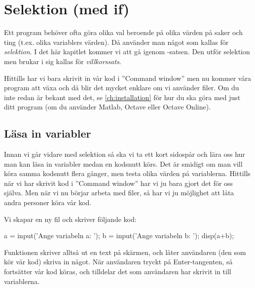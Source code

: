 %
%
\chapter{Selektion (med if)}\label{ch:selektion}
Ett program behöver ofta göra olika val beroende på olika värden på saker och ting (t.ex. olika variablers värden). Då använder man något som kallas för \emph{selektion}. I det här kapitlet kommer vi att gå igenom -satsen. Den utför selektion men brukar i sig kallas för \emph{villkorssats}.

Hittills har vi bara skrivit in vår kod i ''Command window'' men nu kommer våra program att växa och då blir det mycket enklare om vi använder filer. Om du inte redan är bekant med det, se \autoref{ch:installation} för hur du ska göra med just ditt program (om du använder Matlab, Octave eller Octave Online).

\section{Läsa in variabler}
Innan vi går vidare med selektion så ska vi ta ett kort sidospår och lära oss hur man kan läsa in variabler medan en kodsnutt körs. Det är smidigt om man vill köra samma kodsnutt flera gånger, men testa olika värden på variablerna. Hittills när vi har skrivit kod i ''Command window'' har vi ju bara gjort det för oss själva. Men när vi nu börjar arbeta med filer, så har vi ju möjlighet att låta andra personer köra vår kod.

Vi skapar en ny fil och skriver följande kod:

\begin{matlab}[caption={Läsa in variabler},label={}]
a = input('Ange variabeln a: ');
b = input('Ange variabeln b: ');
disp(a+b);
\end{matlab}

Funktionen  skriver alltså ut en text på skärmen, och låter användaren (den som kör vår kod) skriva in något. När användaren tryckt på Enter-tangenten, så fortsätter vår kod köras, och tilldelar det som användaren har skrivit in till variablerna.

